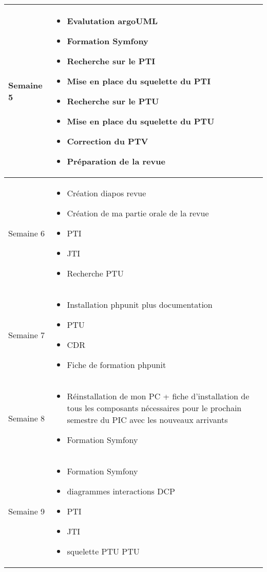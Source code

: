 \documentclass [a4paper] {article}
\begin{document}
\section*{\Michel}

\begin{tabularx}{16.8cm}{|>{\columncolor{gray!40}}l|X|}
	\hline
	Semaine 5 & \begin{itemize}
					\item Evalutation argoUML
					\item Formation Symfony
					\item Recherche sur le PTI 
					\item Mise en place du squelette du PTI
					\item Recherche sur le PTU
					\item Mise en place du squelette du PTU
					\item Correction du PTV
					\item Préparation de la revue
				\end{itemize} \\
	\hline
	
	Semaine 6 & \begin{itemize}
					\item Création diapos revue
					\item Création de ma partie orale de la revue
					\item PTI
					\item JTI
					\item Recherche PTU
				\end{itemize} \\
				
	\hline
	
	Semaine 7 & \begin{itemize}
					\item Installation phpunit plus documentation
					\item PTU
					\item CDR
					\item Fiche de formation phpunit
				\end{itemize}\\
	\hline

	Semaine 8 & \begin{itemize}
					\item Réinstallation de mon PC + fiche d'installation de tous les composants nécessaires pour le prochain semestre du PIC avec les nouveaux arrivants
					\item Formation Symfony
				\end{itemize}\\
	\hline
	
	Semaine 9 & \begin{itemize}
					\item Formation Symfony
					\item diagrammes interactions DCP
					\item PTI
					\item JTI
					\item squelette PTU PTU
				\end{itemize}\\
	\hline
\end{tabularx}
\end{document}
